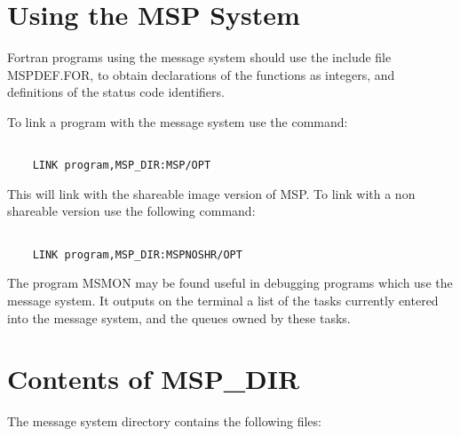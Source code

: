\section{Using the MSP System}

Fortran programs using the message system should use the include
file MSPDEF.FOR, to obtain declarations of the functions as integers,
and definitions of the status code identifiers.

To link a program with the message system use the command:
\begin{verbatim}

    LINK program,MSP_DIR:MSP/OPT

\end{verbatim}
This will link with the shareable image version of MSP. To link with a non
shareable version use the following command:
\begin{verbatim}

    LINK program,MSP_DIR:MSPNOSHR/OPT

\end{verbatim}
The program MSMON may be found useful in debugging programs which
use the message system. It outputs on the terminal a list of the tasks
currently entered into the message system, and the queues owned by
these tasks.

\section{Contents of MSP\_DIR}

The message system directory contains the following files:

